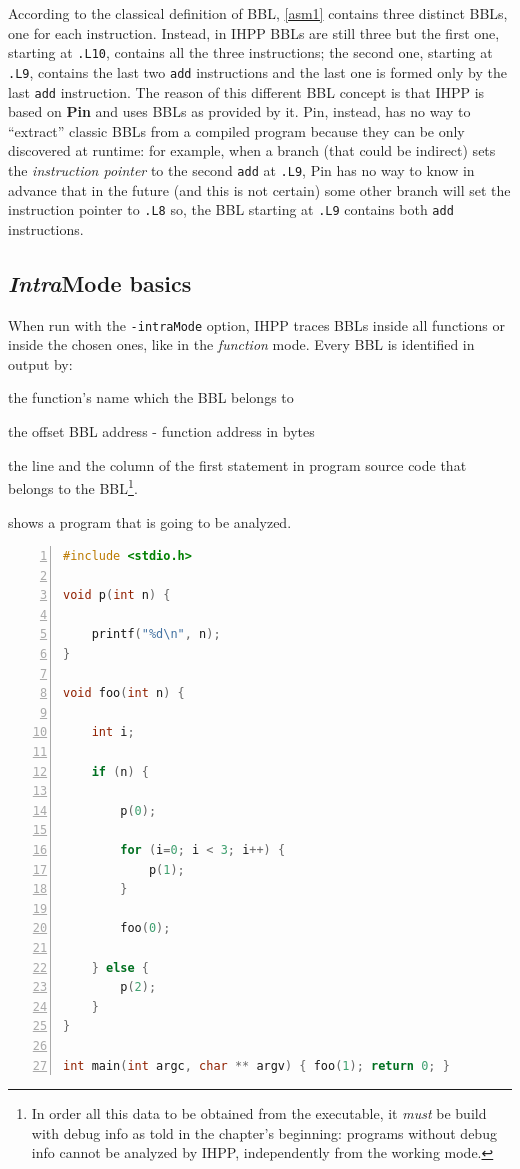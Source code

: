 \documentclass[a4paper,10pt]{report}
\begin{document}
\noindent
According to the classical definition of BBL, \cref{asm1} contains three distinct BBLs, one for each instruction. Instead, in IHPP BBLs are still three but the first one, starting at \verb|.L10|, contains all the three instructions; the second one, starting at \verb|.L9|, contains the last two \verb|add| instructions and the last one is formed only by the 
last \verb|add| instruction. The reason of this different BBL concept is that 
IHPP is based on \textbf{Pin} and uses BBLs as provided by it. 
Pin, instead, has no way to ``extract'' classic BBLs from a compiled program because 
they can be only discovered at runtime: for example, when a branch (that could be indirect) sets the \emph{instruction pointer} to the second \verb|add| at \verb|.L9|, 
Pin has no way to know in advance that in the future (and this is not certain) some 
other branch will set the instruction pointer to \verb|.L8| so, the BBL starting at \verb|.L9| contains both \verb|add| instructions.

\subsection{\emph{Intra}Mode basics}

When run with the \verb|-intraMode| option, IHPP traces BBLs inside all functions or inside the chosen ones, like in the \emph{function} mode. Every BBL is identified in output by: 
\begin{itemize*}
\item the function's name which the BBL belongs to
\item the offset BBL address - function address in bytes
\item the line and the column of the first 
statement in program source code that belongs to the BBL\footnote{In order all this data to be obtained from the executable, it \emph{must} be build 
with debug info as told in the chapter's beginning: programs without debug info 
cannot be analyzed by IHPP, independently from the working mode.}.
\end{itemize*}

 shows a program that is going to be analyzed.

\begin{lstlisting}[language=C, 
	caption={prog4.c, another simple program}, label=prog4, frame=leftline, numbers=left]
#include <stdio.h>

void p(int n) { 
	
	printf("%d\n", n); 
}

void foo(int n) {

	int i;

	if (n) {

		p(0);

		for (i=0; i < 3; i++) {
			p(1);
		}

		foo(0);

	} else {
		p(2);
	}
}

int main(int argc, char ** argv) { foo(1); return 0; }
\end{lstlisting}
\end{document}
